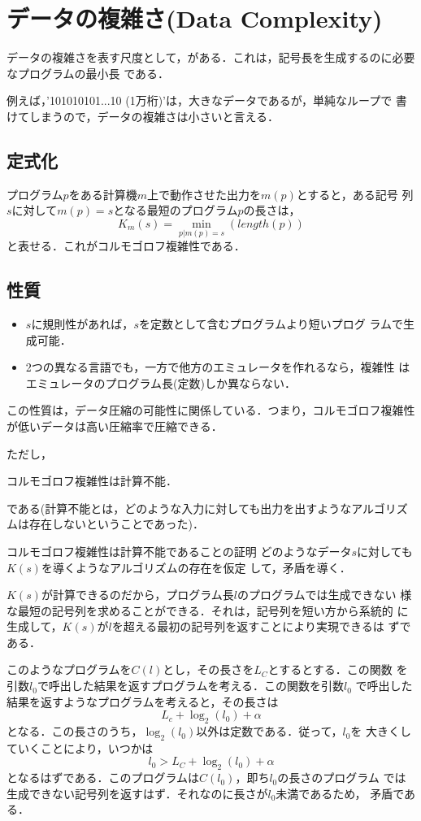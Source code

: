 \chapter{データの複雑さ(Data Complexity)}
データの複雑さを表す尺度として，がある．これは，記号長を生成するのに必要なプログラムの最小長
である．

例えば，'101010101...10 (1万桁)'は，大きなデータであるが，単純なループで
書けてしまうので，データの複雑さは小さいと言える．

\section{定式化}
プログラム$p$をある計算機$m$上で動作させた出力を$m(p)$とすると，ある記号
列$s$に対して$m(p) = s$となる最短のプログラム$p$の長さは，
\[
 K_m (s) = \min _{p | m(p) = s} \left(length(p)\right)
\]
と表せる．これがコルモゴロフ複雑性である．

\section{性質}
\begin{itemize}
 \item $s$に規則性があれば，$s$を定数として含むプログラムより短いプログ
       ラムで生成可能．
 \item 2つの異なる言語でも，一方で他方のエミュレータを作れるなら，複雑性
       はエミュレータのプログラム長(定数)しか異ならない．
\end{itemize}

この性質は，データ圧縮の可能性に関係している．つまり，コルモゴロフ複雑性
が低いデータは高い圧縮率で圧縮できる．

ただし，
\begin{mytheorem}
 \item コルモゴロフ複雑性は計算不能．
\end{mytheorem}
である(計算不能とは，どのような入力に対しても出力を出すようなアルゴリズ
ムは存在しないということであった)．

\begin{myproof}{コルモゴロフ複雑性は計算不能であることの証明}
 どのようなデータ$s$に対しても$K(s)$を導くようなアルゴリズムの存在を仮定
 して，矛盾を導く．

$K(s)$が計算できるのだから，プログラム長$l$のプログラムでは生成できない
 様な最短の記号列を求めることができる．それは，記号列を短い方から系統的
 に生成して，$K(s)$が$l$を超える最初の記号列を返すことにより実現できるは
 ずである．

このようなプログラムを$C(l)$とし，その長さを$L_C$とするとする．この関数
 を引数$l_0$で呼出した結果を返すプログラムを考える．この関数を引数$l_0$
 で呼出した結果を返すようなプログラムを考えると，その長さは
\[
 L_c + \log_2 (l_0) + \alpha
\]
となる．この長さのうち，$\log_2 (l_0)$以外は定数である．従って，$l_0$を
 大きくしていくことにより，いつかは
\[
 l_0 > L_C + \log_2 (l_0) + \alpha
\]
となるはずである．このプログラムは$C(l_0)$，即ち$l_0$の長さのプログラム
 では生成できない記号列を返すはず．それなのに長さが$l_0$未満であるため，
 矛盾である．
\end{myproof}
